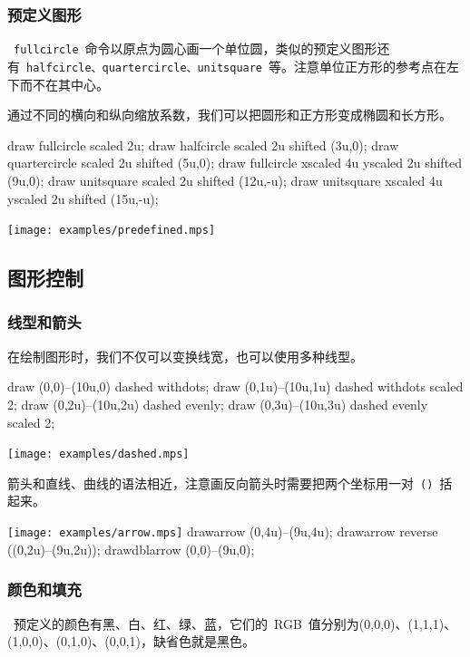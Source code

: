 \subsubsection{预定义图形}
~\verb|fullcircle|~命令以原点为圆心画一个单位圆，类似的预定义图形还有~\verb|halfcircle、quartercircle、unitsquare|~等。注意单位正方形的参考点在左下而不在其中心。

通过不同的横向和纵向缩放系数，我们可以把圆形和正方形变成椭圆和长方形。

\begin{code}
draw fullcircle scaled 2u;
draw halfcircle scaled 2u shifted (3u,0);
draw quartercircle scaled 2u shifted (5u,0);
draw fullcircle xscaled 4u yscaled 2u shifted (9u,0);
draw unitsquare scaled 2u shifted (12u,-u);
draw unitsquare xscaled 4u yscaled 2u shifted (15u,-u);
\end{code}

\begin{out}
\texttt{[image: examples/predefined.mps]}
\end{out}

\subsection{图形控制}

\subsubsection{线型和箭头}
在绘制图形时，我们不仅可以变换线宽，也可以使用多种线型。
\begin{code}
draw (0,0)--(10u,0) dashed withdots;
draw (0,1u)--(10u,1u) dashed withdots scaled 2;
draw (0,2u)--(10u,2u) dashed evenly;
draw (0,3u)--(10u,3u) dashed evenly scaled 2;
\end{code}

\begin{out}
\texttt{[image: examples/dashed.mps]}
\end{out}

箭头和直线、曲线的语法相近，注意画反向箭头时需要把两个坐标用一对~\verb|()|~括起来。

\begin{fdemo}{\texttt{[image: examples/arrow.mps]}}
drawarrow (0,4u)--(9u,4u);
drawarrow reverse ((0,2u)--(9u,2u));
drawdblarrow (0,0)--(9u,0);
\end{fdemo}

\subsubsection{颜色和填充}
\MP~预定义的颜色有黑、白、红、绿、蓝，它们的~RGB~值分别为(0,0,0)、(1,1,1)、(1,0,0)、(0,1,0)、(0,0,1)，缺省色就是黑色。

